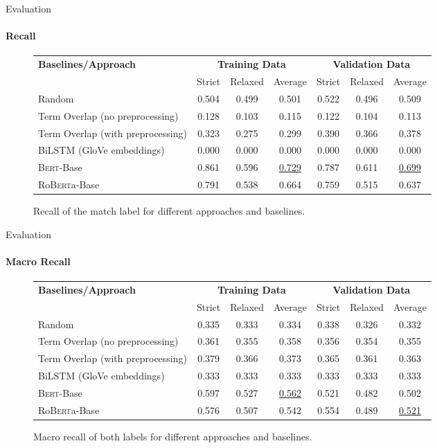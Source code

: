 \documentclass[english,handout]{mlutalk}
\newcommand{\Bert}{\textsc{Bert}\xspace}
\newcommand{\BertBase}{\Bert-Base\xspace}
\newcommand{\Roberta}{\mbox{Ro\textsc{Bert}a}\xspace}
\newcommand{\RobertaBase}{\Roberta-Base\xspace}
\begin{document}
\begin{frame}{Evaluation}
  \framesubtitle{Recall}
  \begin{figure}
    \centering
    \caption{Recall of the match label for different approaches and baselines.}
    \tiny
    \begin{tabular}{lcccccc}
      \toprule
      \textbf{Baselines/Approach} & \multicolumn{3}{c}{\textbf{Training Data}} & \multicolumn{3}{c}{\textbf{Validation Data}}\\
      \cmidrule(r{0.5em}){2-4} \cmidrule(l{0.5em}){5-7}
      & Strict & Relaxed & Average & Strict & Relaxed & Average\\
      \midrule
      Random 
      & 0.504 & 0.499 & 0.501 & 0.522 & 0.496 & 0.509 \\
      Term Overlap (no preprocessing)
      & 0.128 & 0.103 & 0.115 & 0.122 & 0.104 & 0.113 \\
      Term Overlap (with preprocessing)
      & 0.323 & 0.275 & 0.299 & 0.390 & 0.366 & 0.378 \\
      \midrule
      BiLSTM (GloVe embeddings)
      & 0.000 & 0.000 & 0.000 & 0.000 & 0.000 & 0.000 \\
      \BertBase
      & 0.861 & 0.596 & \underline{0.729} & 0.787 & 0.611 & \underline{0.699} \\
      \RobertaBase
      & 0.791 & 0.538 & 0.664 & 0.759 & 0.515 & 0.637 \\
      \bottomrule
    \end{tabular}
  \end{figure}
\end{frame}

\begin{frame}{Evaluation}
  \framesubtitle{Macro Recall}
  \begin{figure}
    \centering
    \caption{Macro recall of both labels for different approaches and baselines.}
    \tiny
    \begin{tabular}{lcccccc}
      \toprule
      \textbf{Baselines/Approach} & \multicolumn{3}{c}{\textbf{Training Data}} & \multicolumn{3}{c}{\textbf{Validation Data}}\\
      \cmidrule(r{0.5em}){2-4} \cmidrule(l{0.5em}){5-7}
      & Strict & Relaxed & Average & Strict & Relaxed & Average\\
      \midrule
      Random 
      & 0.335 & 0.333 & 0.334 & 0.338 & 0.326 & 0.332 \\
      Term Overlap (no preprocessing)
      & 0.361 & 0.355 & 0.358 & 0.356 & 0.354 & 0.355 \\
      Term Overlap (with preprocessing)
      & 0.379 & 0.366 & 0.373 & 0.365 & 0.361 & 0.363 \\
      \midrule
      BiLSTM (GloVe embeddings)
      & 0.333 & 0.333 & 0.333 & 0.333 & 0.333 & 0.333 \\
      \BertBase
      & 0.597 & 0.527 & \underline{0.562} & 0.521 & 0.482 & 0.502 \\
      \RobertaBase
      & 0.576 & 0.507 & 0.542 & 0.554 & 0.489 & \underline{0.521} \\
      \bottomrule
    \end{tabular}
  \end{figure}
\end{frame}
\end{document}
